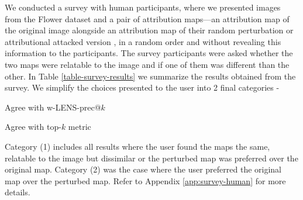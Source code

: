\documentclass[letterpaper]{article} %
\begin{document}
We conducted a survey with human participants, where we presented images from the Flower dataset and a pair of attribution maps---an attribution map of the original image alongside an attribution map of their random perturbation or attributional attacked version \citet{ghorbani2018interpretation}, in a random order and without revealing this information to the participants. The survey participants were asked whether the two maps were relatable to the image and if one of them was different than the other. In Table \ref{table-survey-results} we summarize the results obtained from the survey. We simplify the choices presented to the user into 2 final categories - \begin{inparaenum}[(1)] \item Agree with w-LENS-prec@$k$ \item Agree with top-$k$ metric \end{inparaenum} Category (1) includes all results where the user found the maps the same, relatable to the image but dissimilar or the perturbed map was preferred over the original map. Category (2) was the case where the user preferred the original map over the perturbed map. Refer to Appendix \ref{app:survey-human} for more details.

\begin{table}[!ht]
\vspace{-9pt}
\begin{center}
\vspace{-6pt}
\end{center}
\caption{Survey results based on humans ability to relate the explanation map to the original image with or without noise using the Flower dataset.}
\label{table-survey-results}
\end{table}
\end{document}
